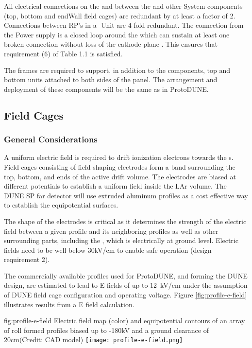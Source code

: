 All electrical connections on the  and between the  and other  System components (top, bottom and endWall field cages) are redundant by at least a factor of 2.  Connections between RP's in a -Unit are 4-fold redundant.  The  connection from the  Power supply is a closed loop around the  which can sustain at least one broken connection without loss of the cathode plane .  This ensures that requirement (6) of Table 1.1 is satisfied.

The  frames are required to support, in addition to the  components, top and bottom  units attached to both sides of the  panel. The arrangement and deployment of these components will be the same as in ProtoDUNE.  

\subsection{Field Cages}

\subsubsection{General Considerations}

A uniform electric field is required to drift ionization electrons towards the s. Field cages consisting of field shaping electrodes form a band surrounding the top, bottom, and ends of the active drift volume. The electrodes are biased at different potentials to establish a uniform field inside the LAr volume.
The DUNE SP far detector will use extruded aluminum profiles as a cost effective way to establish the equipotential surfaces. 

The shape of the electrodes is critical as it determines the strength of the electric field between a given profile and its neighboring profiles as well as
other surrounding parts, including the , which is electrically at ground level. Electric fields need to be well below 30kV/cm 
to enable safe  operation (design requirement 2).

The commercially available profiles used for ProtoDUNE, and forming the DUNE design, are estimated to lead to E fields of up to 12~kV/cm under the assumption of DUNE field cage configuration 
and operating voltage. Figure \ref{fig:profile-e-field} illustrates results from a E field calculation.

\begin{dunefigure}
{fig:profile-e-field}
{Electric field map (color) and equipotential contours of an array of roll formed profiles biased up to -180kV and a ground clearance of 20cm(Credit: CAD model)} \texttt{[image: profile-e-field.png]}
\end{dunefigure}

